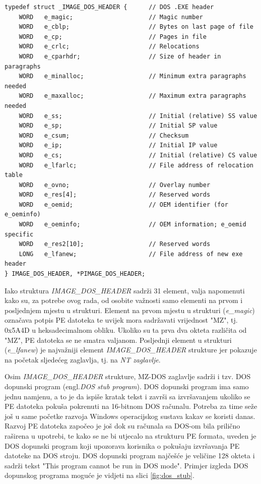 \documentclass[times, utf8, diplomski, numeric]{fer}
\begin{document}
\begin{lstlisting}[frame=single, caption=IMAGE\_DOS\_HEADER struktura, label={lst:imgDosHeader}]
typedef struct _IMAGE_DOS_HEADER {      // DOS .EXE header
	WORD   e_magic;                     // Magic number
	WORD   e_cblp;                      // Bytes on last page of file
	WORD   e_cp;                        // Pages in file
	WORD   e_crlc;                      // Relocations
	WORD   e_cparhdr;                   // Size of header in paragraphs
	WORD   e_minalloc;                  // Minimum extra paragraphs needed
	WORD   e_maxalloc;                  // Maximum extra paragraphs needed
	WORD   e_ss;                        // Initial (relative) SS value
	WORD   e_sp;                        // Initial SP value
	WORD   e_csum;                      // Checksum
	WORD   e_ip;                        // Initial IP value
	WORD   e_cs;                        // Initial (relative) CS value
	WORD   e_lfarlc;                    // File address of relocation table
	WORD   e_ovno;                      // Overlay number
	WORD   e_res[4];                    // Reserved words
	WORD   e_oemid;                     // OEM identifier (for e_oeminfo)
	WORD   e_oeminfo;                   // OEM information; e_oemid specific
	WORD   e_res2[10];                  // Reserved words
	LONG   e_lfanew;                    // File address of new exe header
} IMAGE_DOS_HEADER, *PIMAGE_DOS_HEADER;
\end{lstlisting}

Iako struktura \emph{IMAGE\_DOS\_HEADER} sadrži 31 element, valja
napomenuti kako su, za potrebe ovog rada, od osobite važnosti
samo elementi na prvom i posljednjem mjestu u strukturi. Element
na prvom mjestu u strukturi (\emph{e\_magic}) označava potpis PE
datoteka te uvijek mora sadržavati vrijednost "MZ", tj. 0x5A4D u
heksadecimalnom obliku. Ukoliko su ta prva dva okteta različita
od "MZ", PE datoteka se ne smatra valjanom. Posljednji element u
strukturi (\emph{e\_lfanew}) je najvažniji element
\emph{IMAGE\_DOS\_HEADER} strukture jer pokazuje na početak				%
sljedećeg zaglavlja, tj. na \emph{NT zaglavlje}.

Osim \emph{IMAGE\_DOS\_HEADER} strukture, MZ-DOS zaglavlje sadrži
i tzv. DOS dopunski program (engl.\emph{DOS stub
program})\citep{dos_stub}. DOS dopunski program ima samo jednu
namjenu, a to je da ispiše kratak tekst i završi sa izvršavanjem
ukoliko se PE datoteka pokuša pokrenuti na 16-bitnom DOS računalu.
Potreba za time seže još u same početke razvoja Windows
operacijskog sustava kakav se koristi danas. Razvoj PE datoteka
započeo je još dok su računala sa DOS-om bila prilično raširena u
upotrebi, te kako se ne bi utjecalo na strukturu PE formata,
uveden je DOS dopunski program koji upozorava korisnika o
pokušaju izvršavanja PE datoteke na DOS stroju. DOS dopunski
program najčešće je veličine 128 okteta i sadrži tekst "This
program cannot be run in DOS mode". Primjer izgleda DOS dopunskog
programa moguće je vidjeti na slici \ref{fig:dos_stub}.
\end{document}
